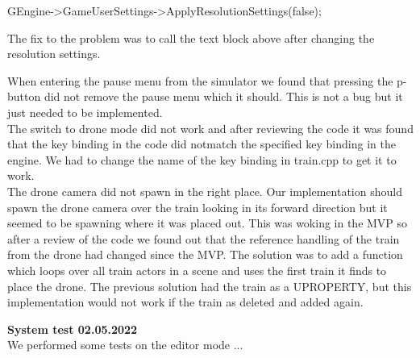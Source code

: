 \begin{code}
	GEngine->GameUserSettings->ApplyResolutionSettings(false);
\end{code}

The fix to the problem was to call the text block above after changing the resolution settings.

When entering the pause menu from the simulator we found that pressing the p-button did not remove the pause menu which it should. This is not a bug but it just needed to be implemented. \\

The switch to drone mode did not work and after reviewing the code it was found that the key binding in the code did notmatch the specified key binding in the engine. We had to change the name of the key binding in train.cpp to get it to work. \\

The drone camera did not spawn in the right place. Our implementation should spawn the drone camera over the train looking in its forward direction but it seemed to be spawning where it was placed out. This was woking in the MVP so after a review of the code we found out that the reference handling of the train from the drone had changed since the MVP. The solution was to add a function which loops over all train actors in a scene and uses the first train it finds to place the drone. The previous solution had the train as a UPROPERTY, but this implementation would not work if the train as deleted and added again.

\textbf{System test 02.05.2022} \\
We performed some tests on the editor mode ...



